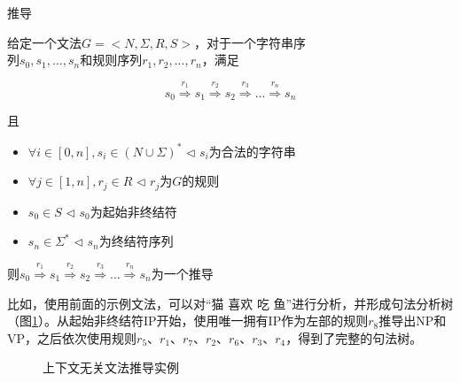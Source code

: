 \vspace{0.5em}
\begin{definition} 推导

给定一个文法$G=<N,\Sigma,R,S>$，对于一个字符串序 \\
列$s_0,s_1,...,s_n$和规则序列$r_1,r_2,...,r_n$，满足

\vspace{-0.5em}
\begin{displaymath}
s_0 \overset{r_1}{\Rightarrow} s_1 \overset{r_2}{\Rightarrow} s_2 \overset{r_3}{\Rightarrow} ... \overset{r_{n}}{\Rightarrow} s_n
\end{displaymath}

且
\begin{itemize}
\vspace{0.5em}
\item $\forall i \in [0,n], s_i \in (N\cup\Sigma)^*$ \hspace{3.5em} $\lhd$ $s_i$为合法的字符串
\vspace{0.5em}
\item $\forall j \in [1,n], r_j \in R$ \hspace{6.3em} $\lhd$ $r_j$为$G$的规则
\vspace{0.5em}
\item $s_0 \in S$ \hspace{10.9em} $\lhd$ $s_0$为起始非终结符
\vspace{0.5em}
\item $s_n \in \Sigma^{*}$ \hspace{10.4em} $\lhd$ $s_n$为终结符序列
\vspace{0.5em}
\end{itemize}

\vspace{0.8em}
则$s_0 \overset{r_1}{\Rightarrow} s_1 \overset{r_2}{\Rightarrow} s_2 \overset{r_3}{\Rightarrow} ... \overset{r_{n}}{\Rightarrow} s_n$为一个推导
\end{definition}

\parinterval 比如，使用前面的示例文法，可以对``猫 喜欢 吃 鱼''进行分析，并形成句法分析树（图\ref{fig:2-22}）。从起始非终结符IP开始，使用唯一拥有IP作为左部的规则$r_8$推导出NP和VP，之后依次使用规则$r_5$、$r_1$、$r_7$、$r_2$、$r_6$、$r_3$、$r_4$，得到了完整的句法树。

\begin{figure}[htp]
    \centering

	\caption{上下文无关文法推导实例}
    \label{fig:2-22}
\end{figure}

